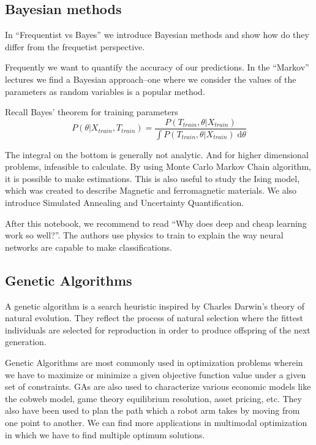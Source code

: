\documentclass[11pt,letterpaper]{report}
\begin{document}
	
\subsection{Bayesian methods}
In ``Frequentist vs Bayes''
 we introduce Bayesian methods and show how do they differ from the frequetist perspective. 
 
Frequently we want to quantify the accuracy of our predictions. In the ``Markov'' lectures we find a Bayesian approach--one where we consider the values of the parameters as random variables is a popular method.

Recall Bayes' theorem for training parameters
\begin{equation}
P(\theta|X_{train}, T_{train}) = \frac{P(T_{train}, \theta|X_{train})}{\int P(T_{train}, \theta|X_{train})\;\mathrm{d}\theta} 
\end{equation}

The integral on the bottom is generally not analytic. And for higher dimensional problems, infeasible to calculate. By using Monte Carlo Markov Chain algorithm, it is possible to make estimations.  This is also useful to study   the Ising model, which was created to describe Magnetic and ferromagnetic materials. We also introduce Simulated Annealing and Uncertainty Quantification.

After this notebook,  we recommend to read ``Why does deep and cheap learning work so well?''.  The authors use physics to train to explain the way neural networks are capable to make classifications. 
\subsection{Genetic Algorithms}
A genetic algorithm is a search heuristic  inspired by Charles Darwin’s theory of natural evolution. They reflect the process of natural selection where the fittest individuals are selected for reproduction in order to produce offspring of the next generation.



Genetic Algorithms are most commonly used in optimization problems wherein we have to maximize or minimize a given objective function value under a given set of constraints. GAs are also used to characterize various economic models like the cobweb model, game theory equilibrium resolution, asset pricing, etc. They also have been used to plan the path which a robot arm takes by moving from one point to another. We can find more applications in multimodal optimization in which we have to find multiple optimum solutions.
\end{document}
